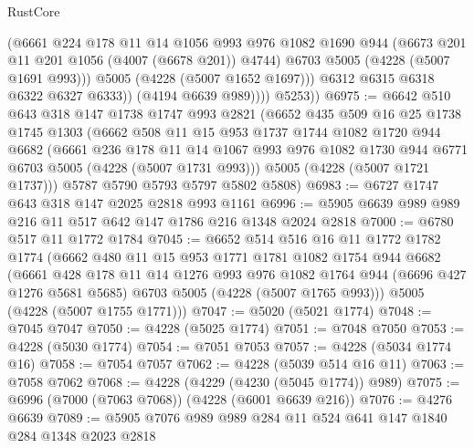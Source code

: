 \begin{lexlean}{RustCore}
\begin{coremodule}
                    (@6661
                      @224
                      @178
                      @11
                      @14
                      @1056
                      @993
                      @976
                      @1082
                      @1690
                      @944
                      (@6673 @201 @11 @201 @1056 (@4007 (@6678 @201)) @4744)
                      @6703
                      @5005
                      (@4228 (@5007 @1691 @993)))
                    @5005
                    (@4228 (@5007 @1652 @1697)))
                  @6312
                  @6315
                  @6318
                  @6322
                  @6327
                  @6333))
              (@4194 @6639 @989))))
        @5253))
@6975 := @6642
    @510
    @643
    @318
    @147
    @1738
    @1747
    @993
    @2821
    (@6652
      @435
      @509
      @16
      @25
      @1738
      @1745
      @1303
      (@6662
        @508
        @11
        @15
        @953
        @1737
        @1744
        @1082
        @1720
        @944
        @6682
        (@6661
          @236
          @178
          @11
          @14
          @1067
          @993
          @976
          @1082
          @1730
          @944
          @6771
          @6703
          @5005
          (@4228 (@5007 @1731 @993)))
        @5005
        (@4228 (@5007 @1721 @1737)))
      @5787
      @5790
      @5793
      @5797
      @5802
      @5808)
@6983 := @6727 @1747 @643 @318 @147 @2025 @2818 @993 @1161
@6996 := @5905 @6639 @989 @989 @216 @11 @517 @642 @147 @1786 @216 @1348 @2024 @2818
@7000 := @6780 @517 @11 @1772 @1784
@7045 := @6652
    @514
    @516
    @16
    @11
    @1772
    @1782
    @1774
    (@6662
      @480
      @11
      @15
      @953
      @1771
      @1781
      @1082
      @1754
      @944
      @6682
      (@6661
        @428
        @178
        @11
        @14
        @1276
        @993
        @976
        @1082
        @1764
        @944
        (@6696 @427 @1276 @5681 @5685)
        @6703
        @5005
        (@4228 (@5007 @1765 @993)))
      @5005
      (@4228 (@5007 @1755 @1771)))
@7047 := @5020 (@5021 @1774)
@7048 := @7045 @7047
@7050 := @4228 (@5025 @1774)
@7051 := @7048 @7050
@7053 := @4228 (@5030 @1774)
@7054 := @7051 @7053
@7057 := @4228 (@5034 @1774 @16)
@7058 := @7054 @7057
@7062 := @4228 (@5039 @514 @16 @11)
@7063 := @7058 @7062
@7068 := @4228 (@4229 (@4230 (@5045 @1774)) @989)
@7075 := @6996 (@7000 (@7063 @7068)) (@4228 (@6001 @6639 @216))
@7076 := @4276 @6639
@7089 := @5905 @7076 @989 @989 @284 @11 @524 @641 @147 @1840 @284 @1348 @2023 @2818

\end{coremodule}
\end{lexlean}
